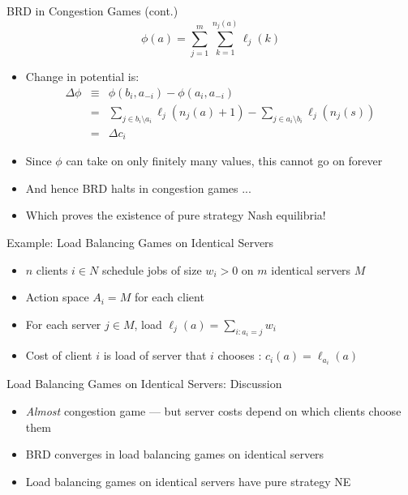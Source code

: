 \documentclass[11pt,aspectratio=169]{beamer}
\begin{document}
  
  \begin{frame}{BRD in Congestion Games (cont.)}
   $$\phi(a) = \sum_{j=1}^m \sum_{k=1}^{n_j(a)} \ell_j(k)$$
   \begin{itemize}[<+->]
    \item Change in potential is:
    \begin{eqnarray*}
     \Delta\phi & \equiv & \phi(b_i, a_{-i}) - \phi(a_i, a_{-i}) \\
     & = & \sum_{j \in b_i\setminus a_i}\ell_j(n_j(a)+1) - \sum_{j \in a_i \setminus b_i}\ell_j(n_j(s)) \\
     & = & \Delta c_i
    \end{eqnarray*}
    \item Since $\phi$ can take on only finitely many values, this cannot go on forever
    \item And hence BRD halts in congestion games ...
    \item Which proves the \alert{existence} of pure strategy Nash equilibria!
   \end{itemize}
  \end{frame}
  
  
  \begin{frame}{Example: Load Balancing Games on Identical Servers}
   \begin{itemize}[<+->]
   \setlength{\itemsep}{1.5em}
    \item $n$ clients $i \in N$ schedule jobs of size $w_i > 0$ on $m$ identical servers $M$
    \item Action space $A_i = M$ for each client
    \item For each server $j \in M$, load $\ell_j(a) = \sum_{i : a_i = j}w_i$
    \item Cost of client $i$ is load of server that $i$ chooses : $c_i(a) = \ell_{a_i}(a)$
   \end{itemize}
  \end{frame}
  
  
  \begin{frame}{Load Balancing Games on Identical Servers: Discussion}
   \begin{itemize}[<+->]
   \setlength{\itemsep}{1.5em}
    \item \textit{Almost} congestion game --- but server costs depend on \alert{which} clients choose them
    \item BRD converges in load balancing games on identical servers
    \item Load balancing games on identical servers have pure strategy NE
   \end{itemize}
  \end{frame}
  
\end{document}
